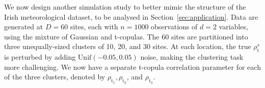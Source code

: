 \documentclass[12pt,compact]{article}
\newcommand{\rhou}[1]{\rho_{\text{#1}}}
\begin{document}
We now design another simulation study to better mimic the structure of the Irish meteorological dataset, to be analysed in Section~\ref{sec:application}. 
Data are generated at $D = 60$ sites, each with $n = 1000$ observations of $d = 2$ variables, using the mixture of Gaussian and t-copulas.
The 60 sites are partitioned into three unequally-sized clusters of 10, 20, and 30 sites. %
At each location, the true $\rho_{\text{t}}^s$ is perturbed by adding $\text{Unif}(-0.05, 0.05)$ noise, making the clustering task more challenging.
We now have a separate t-copula correlation parameter for each of the three clusters, denoted by $\rho_{\text{t}_1}, \rho_{\text{t}_2}$, and $\rho_{\text{t}_3}$.
\end{document}
